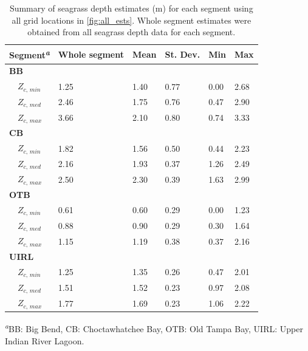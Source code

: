 \documentclass[letterpaper,12pt,oneside]{article}\usepackage[]{graphicx}\usepackage[]{color}
\begin{document}
\begin{table}[!tbp]
\caption{Summary of seagrass depth estimates (m) for each segment using all grid locations in \cref{fig:all_ests}.  Whole segment estimates were obtained from all seagrass depth data for each segment.\label{tab:est_summ}} 
\begin{center}
\begin{tabular}{llllll}
\hline\hline
\multicolumn{1}{l}{{\bf Segment\textsuperscript{\textit{a}}}}&\multicolumn{1}{c}{Whole segment}&\multicolumn{1}{c}{Mean}&\multicolumn{1}{c}{St. Dev.}&\multicolumn{1}{c}{Min}&\multicolumn{1}{c}{Max}\tabularnewline
\hline
{\bfseries BB}&&&&&\tabularnewline
~~$Z_{c,\,min}$&1.25&1.40&0.77&0.00&2.68\tabularnewline
~~$Z_{c,\,med}$&2.46&1.75&0.76&0.47&2.90\tabularnewline
~~$Z_{c,\,max}$&3.66&2.10&0.80&0.74&3.33\tabularnewline
\hline
{\bfseries CB}&&&&&\tabularnewline
~~$Z_{c,\,min}$&1.82&1.56&0.50&0.44&2.23\tabularnewline
~~$Z_{c,\,med}$&2.16&1.93&0.37&1.26&2.49\tabularnewline
~~$Z_{c,\,max}$&2.50&2.30&0.39&1.63&2.99\tabularnewline
\hline
{\bfseries OTB}&&&&&\tabularnewline
~~$Z_{c,\,min}$&0.61&0.60&0.29&0.00&1.23\tabularnewline
~~$Z_{c,\,med}$&0.88&0.90&0.29&0.30&1.64\tabularnewline
~~$Z_{c,\,max}$&1.15&1.19&0.38&0.37&2.16\tabularnewline
\hline
{\bfseries UIRL}&&&&&\tabularnewline
~~$Z_{c,\,min}$&1.25&1.35&0.26&0.47&2.01\tabularnewline
~~$Z_{c,\,med}$&1.51&1.52&0.23&0.97&2.08\tabularnewline
~~$Z_{c,\,max}$&1.77&1.69&0.23&1.06&2.22\tabularnewline
\hline
\end{tabular}\end{center}

\textsuperscript{\textit{a}}\footnotesize BB: Big Bend, CB: Choctawhatchee Bay, OTB: Old Tampa Bay, UIRL: Upper Indian River Lagoon.\end{table}
\end{document}
